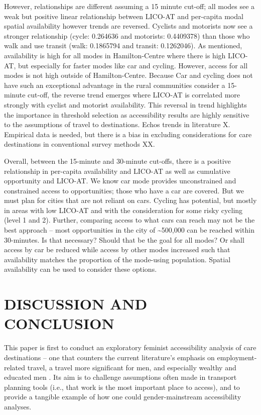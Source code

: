 \documentclass[
  super,
  preprint,
  3p]{elsarticle}
\begin{document}
However, relationships are different assuming a 15 minute cut-off; all
modes see a weak but positive linear relationship between LICO-AT and
per-capita modal spatial availability however trends are reversed.
Cyclists and motorists now see a stronger relationship (cycle: 0.264636
and motorists: 0.4409378) than those who walk and use transit (walk:
0.1865794 and transit: 0.1262046). As mentioned, availability is high
for all modes in Hamilton-Centre where there is high LICO-AT, but
especially for faster modes like car and cycling. However, access for
all modes is not high outside of Hamilton-Centre. Because Car and
cycling does not have such an exceptional advantage in the rural
communities consider a 15-minute cut-off, the reverse trend emerges
where LICO-AT is correlated more strongly with cyclist and motorist
availability. This reversal in trend highlights the importance in
threshold selection as accessibility results are highly sensitive to the
assumptions of travel to destinations. Echos trends in literature X.
Empirical data is needed, but there is a bias in excluding
considerations for care destinations in conventional survey methods XX.

Overall, between the 15-minute and 30-minute cut-offs, there is a
positive relationship in per-capita availability and LICO-AT as well as
cumulative opportunity and LICO-AT. We know car mode provides
unconstrained and constrained access to opportunities; those who have a
car are covered. But we must plan for cities that are not reliant on
cars. Cycling has potential, but mostly in areas with low LICO-AT and
with the consideration for some risky cycling (level 1 and 2). Further,
comparing access to what cars can reach may not be the best approach --
most opportunities in the city of \textasciitilde500,000 can be reached
within 30-minutes. Is that necessary? Should that be the goal for all
modes? Or shall access by car be reduced while access by other modes
increased such that availability matches the proportion of the
mode-using population. Spatial availability can be used to consider
these options.

\hypertarget{discussion-and-conclusion}{%
\section{DISCUSSION AND CONCLUSION}\label{discussion-and-conclusion}}

This paper is first to conduct an exploratory feminist accessibility
analysis of care destinations -- one that counters the current
literature's emphasis on employment-related travel, a travel more
significant for men, and especially wealthy and educated men
\citep{robinlawWomenTransportNew1999, hansonGenderMobilityNew2010}. Its
aim is to challenge assumptions often made in transport planning tools
(i.e., that work is the most important place to access), and to provide
a tangible example of how one could gender-mainstream accessibility
analyses.
\end{document}

